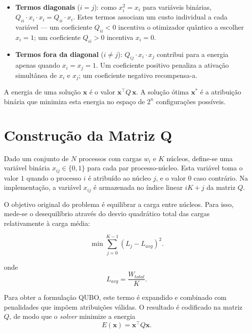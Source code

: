 \begin{itemize}
    \item \textbf{Termos diagonais} ($i = j$): como $x_i^2 = x_i$ para variáveis binárias,
    $Q_{ii} \cdot x_i \cdot x_i = Q_{ii} \cdot x_i$. Estes termos associam um custo individual
    a cada variável --- um coeficiente $Q_{ii} < 0$ incentiva o otimizador quântico a escolher $x_i = 1$; um coeficiente
    $Q_{ii} > 0$ incentiva $x_i = 0$.

    \item \textbf{Termos fora da diagonal} ($i \neq j$): $Q_{ij} \cdot x_i \cdot x_j$ contribui
    para a energia apenas quando $x_i = x_j = 1$. Um coeficiente positivo penaliza a ativação
    simultânea de $x_i$ e $x_j$; um coeficiente negativo recompensa-a.
\end{itemize}

A energia de uma solução $\mathbf{x}$ é o valor $\mathbf{x}^\top Q\, \mathbf{x}$.
A solução ótima $\mathbf{x}^*$ é a atribuição binária que minimiza esta energia no espaço de
$2^n$ configurações possíveis.

\section{Construção da Matriz Q}
\label{sec:construcao-matriz-q}

Dado um conjunto de $N$ processos com cargas $w_i$ e $K$ núcleos, define-se uma
variável binária $x_{ij} \in \{0,1\}$ para cada par processo-núcleo. Esta variável
toma o valor $1$ quando o processo $i$ é atribuído ao núcleo $j$, e o valor $0$
caso contrário.
Na implementação, a variável $x_{ij}$ é armazenada no índice linear $iK+j$ da matriz $Q$.

O objetivo original do problema é equilibrar a carga entre núcleos. Para isso,
mede-se o desequilíbrio através do desvio quadrático total das cargas relativamente
à carga média:

\begin{equation}
    \min \sum_{j=0}^{K-1}(L_j - L_{avg})^2.
\end{equation}

onde
\begin{equation}
    L_{avg} = \frac{W_{total}}{K}.
\end{equation}

Para obter a formulação \acs{QUBO}, este termo é expandido e combinado com penalidades que impõem
atribuições válidas. O resultado é codificado na matriz $Q$, de modo que o \textit{solver}
minimize a energia
\begin{equation}
    E(\mathbf{x}) = \mathbf{x}^{\top}Q\mathbf{x}.
\end{equation}


